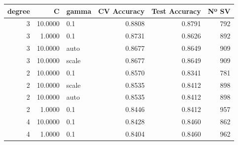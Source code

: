 \begin{tabular}{rrlrrr}
\toprule
degree & C & gamma & CV Accuracy & Test Accuracy & Nº SV \\
\midrule
3 & 10.0000 & 0.1 & 0.8808 & 0.8791 & 792 \\
3 & 1.0000 & 0.1 & 0.8731 & 0.8626 & 892 \\
3 & 10.0000 & auto & 0.8677 & 0.8649 & 909 \\
3 & 10.0000 & scale & 0.8677 & 0.8649 & 909 \\
2 & 10.0000 & 0.1 & 0.8570 & 0.8341 & 781 \\
2 & 10.0000 & scale & 0.8535 & 0.8412 & 898 \\
2 & 10.0000 & auto & 0.8535 & 0.8412 & 898 \\
2 & 1.0000 & 0.1 & 0.8446 & 0.8412 & 957 \\
4 & 10.0000 & 0.1 & 0.8428 & 0.8460 & 862 \\
4 & 1.0000 & 0.1 & 0.8404 & 0.8460 & 962 \\
\bottomrule
\end{tabular}
